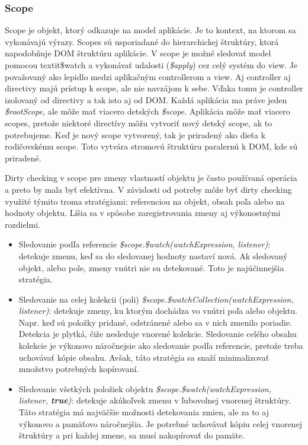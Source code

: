 \subsubsection{Scope}
Scope je objekt, ktorý odkazuje na model aplikácie. Je to kontext, na ktorom sa vykonávajú výrazy. Scopes sú usporiadané do hierarchickej štruktúry, ktorá napodobňuje DOM štruktúru aplikácie. V scope je možné sledovať model pomocou  textit{\$watch} a vykonávať udalosti (\textit{\$apply}) cez celý systém do view. Je považovaný ako lepidlo medzi aplikačným controllerom a view. Aj controller aj directivy majú prístup k scope, ale nie navzájom k sebe. Vďaka tomu je controller izolovaný od directivy a tak isto aj od DOM. 
Každá aplikácia ma práve jeden \textit{\$rootScope}, ale môže mať viacero detských \textit{\$scope}. Aplikácia môže mať viacero scopes, pretože niektoré directívy môžu vytvoriť nový detský scope, ak to potrebujeme. Keď je nový scope vytvorený, tak je priradený ako dieťa k rodičovskému scope. Toto vytvára stromovú štruktúru paralernú k DOM, kde sú priradené.\cite{angular-docs}

Dirty checking v scope pre zmeny vlastností objektu je často používaná operácia a preto by mala byť efektívna. V závislosti od potreby môže byť dirty checking využité týmito troma stratégiami: referenciou na objekt, obsah poľa alebo na hodnoty objektu. Líšia sa v spôsobe zaregistrovania zmeny aj výkonostnými rozdielmi.


\begin{itemize}
  \item Sledovanie podľa referencie \textit{\$scope.\$watch(watchExpression, listener)}: detekuje zmenu, keď sa do sledovanej hodnoty nastaví nová. Ak sledovaný objekt, alebo pole, zmeny vnútri nie su detekované. Toto je najúčinnejšia stratégia.
  \item Sledovanie na celej kolekcii (poli) \textit{\$scope.\$watchCollection(watchExpression, listener)}: detekuje zmeny, ku ktorým dochádza vo vnútri poľa alebo objektu. Napr. keď sú položky pridané, odstránené alebo sa v nich zmenilo poriadie. Detekcia je plytká, čiže nesleduje vnorené kolekcie. Sledovanie celého obsahu kolekcie je výkonovo náročnejsie ako sledovanie podľa referencie, pretože treba uchovávať kópie obsahu. Avšak, táto stratégia sa snaží minimalizovať množstvo potrebných kopírovaní.
  \item Sledovanie všetkých položiek objektu \textit{\$scope.\$watch(watchExpression, listener, \textbf{true})}: detekuje akúkoľvek zmenu v ľubovolnej vnorenej štruktúry. Táto stratégia má najväčšie možnosti detekovania zmien, ale za to aj výkonovo a pamäťovo náročnejšia. Je potrebné uchovávať kópiu celej vnorenej štruktúry a pri každej zmene, sa musí nakopírovať do pamäte.
\end{itemize}

